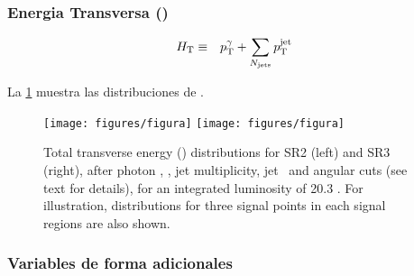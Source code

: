 \subsubsection{Energia Transversa (\HT)}
\label{sec:ht_obj}


\begin{eqnarray} \label{eq:htaddition}
H_{\mathrm{T}}  &\equiv& p_{\mathrm{T}}^{\gamma} + \sum_{N_\mathrm{jets}} p_{\mathrm{T}}^\mathrm{jet}
\end{eqnarray}

La \cref{fig:HT_3SR} muestra las distribuciones de {\HT}.


\begin{figure}[th!]
  \centering
  \texttt{[image: figures/figura]} %
  \texttt{[image: figures/figura]} %
  \caption{Total transverse energy (\HT) distributions for SR2 (left) and SR3 (right),
    after photon \pt, \etmiss, jet multiplicity, jet \pt\ and angular cuts
    (see text for details), for an integrated luminosity of 20.3 \ifb.  For illustration,
    distributions for three signal points in each signal regions are also shown.}
  \label{fig:HT_3SR}
\end{figure}

\subsubsection{Variables de forma adicionales}\label{sec:shape_vars}

